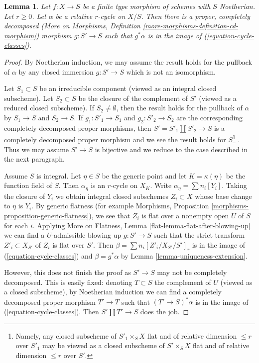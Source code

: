 \documentclass{stacks-project}
\theoremstyle{plain}
\newtheorem{lemma}[subsection]{Lemma}
\theoremstyle{definition}
\theoremstyle{remark}
\numberwithin{equation}{subsection}
\begin{document}
\begin{lemma}
\label{lemma-get-cycles}
Let $f : X \to S$ be a finite type morphism of schemes with $S$ Noetherian.
Let $r \geq 0$. Let $\alpha$ be a relative $r$-cycle on $X/S$. Then there is
a proper, completely decomposed
(More on Morphisms, Definition \ref{more-morphisms-definition-cd-morphism})
morphism $g : S' \to S$ such that $g^*\alpha$ is in the image of
(\ref{equation-cycle-classes}).
\end{lemma}

\begin{proof}
By Noetherian induction, we may assume the result holds for the pullback of
$\alpha$ by any closed immersion $g : S' \to S$ which is not an isomorphism.

\medskip\noindent
Let $S_1 \subset S$ be an irreducible component (viewed as an integral closed
subscheme). Let $S_2 \subset S$ be the closure of the complement of $S'$
(viewed as a reduced closed subscheme). If $S_2 \not = \emptyset$, then
the result holds for the pullback of $\alpha$ by $S_1 \to S$ and $S_2 \to S$.
If $g_1 : S'_1 \to S_1$ and $g_2 : S'_2 \to S_2$
are the corresponding completely decomposed proper morphisms,
then $S' = S'_1 \amalg S'_2 \to S$
is a completely decomposed proper morphism and
we see the result holds for $S$\footnote{Namely, any closed
subscheme of $S'_1 \times_S X$ flat and of relative dimension
$\leq r$ over $S'_1$ may be viewed as a closed subscheme of $S' \times_S X$
flat and of relative dimension $\leq r$ over $S'$.}
. Thus we may assume $S' \to S$ is bijective
and we reduce to the case described in the next paragraph.

\medskip\noindent
Assume $S$ is integral. Let $\eta \in S$ be the generic point
and let $K = \kappa(\eta)$ be the function field of $S$.
Then $\alpha_\eta$ is an $r$-cycle on $X_K$.
Write $\alpha_\eta = \sum n_i[Y_i]$.
Taking the closure of $Y_i$ we obtain integral closed subschemes
$Z_i \subset X$ whose base change to $\eta$ is $Y_i$.
By generic flatness (for example Morphisms,
Proposition \ref{morphisms-proposition-generic-flatness}),
we see that $Z_i$ is flat over a nonempty open $U$ of $S$ for each $i$.
Applying More on Flatness, Lemma \ref{flat-lemma-flat-after-blowing-up}
we can find a $U$-admissible blowing up $g : S' \to S$
such that the strict transform $Z'_i \subset X_{S'}$
of $Z_i$ is flat over $S'$. Then $\beta = \sum n_i[Z'_i/X_{S'}/S']_r$
is in the image of (\ref{equation-cycle-classes}) and $\beta = g^*\alpha$
by Lemma \ref{lemma-uniqueness-extension}.

\medskip\noindent
However, this does not finish the proof as $S' \to S$ may not be
completely decomposed. This is easily fixed: denoting $T \subset S$
the complement of $U$ (viewed as a closed subscheme), by Noetherian
induction we can find a completely decomposed proper morphism
$T' \to T$ such that $(T' \to S)^*\alpha$
is in the image of (\ref{equation-cycle-classes}). Then
$S' \amalg T' \to S$ does the job.
\end{proof}
\end{document}

